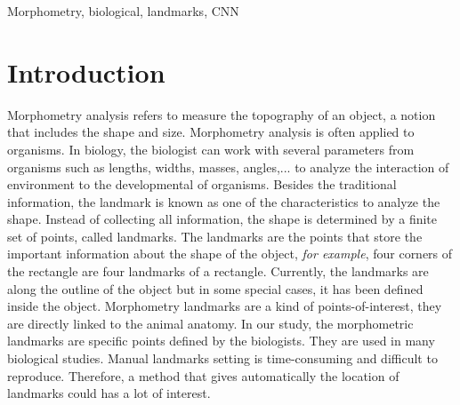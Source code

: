 \documentclass[conference]{IEEEtran}
\begin{document}
\begin{IEEEkeywords}
Morphometry, biological, landmarks, CNN
\end{IEEEkeywords}

\section{Introduction}
Morphometry analysis refers to measure the topography of an object, a notion that includes the shape and size. Morphometry analysis is often applied to organisms. In biology, the biologist can work with several parameters from organisms such as lengths, widths, masses, angles,... to analyze the interaction of environment to the developmental of organisms. Besides the traditional information, the landmark is known as one of the characteristics to analyze the shape. Instead of collecting all information, the shape is determined by a finite set of points, called landmarks. The landmarks are the points that store the important information about the shape of the object, \textit{for example}, four corners of the rectangle are four landmarks of a rectangle. Currently, the landmarks are along the outline of the object but in some special cases, it has been defined inside the object. Morphometry landmarks are a kind of points-of-interest, they are directly linked to the animal anatomy. In our study, the morphometric landmarks are specific points defined by the biologists. They are used in many biological studies. Manual landmarks setting is time-consuming and difficult to reproduce. Therefore, a method that gives automatically the location of landmarks could has a lot of interest.
\end{document}
